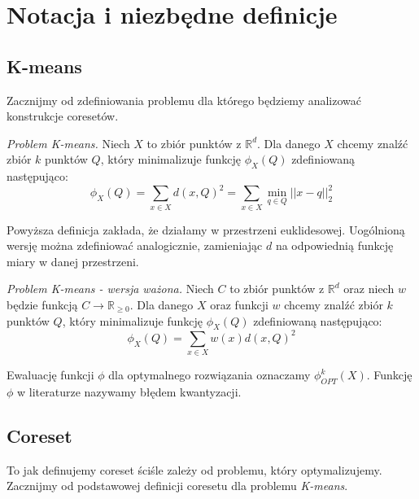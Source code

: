 \chapter{Notacja i niezbędne definicje}\label{preliminaries}
\section{K-means}

Zacznijmy od zdefiniowania problemu dla którego będziemy analizować konstrukcje coresetów.

\begin{definition}
    \emph{Problem K-means.} Niech $X$ to zbiór punktów z $\mathbb{R}^{d}$. 
    Dla danego $X$ chcemy znalźć zbiór $k$ punktów $Q$, który minimalizuje funkcję $\phi_{X}(Q)$ zdefiniowaną następująco:
    \begin{equation}
        \phi_{X}(Q) = \sum_{x \in X} d(x, Q)^{2} = \sum_{x \in X} \min_{q \in Q} || x - q ||_{2}^{2} 
    \end{equation}
\end{definition}

\noindent
Powyższa definicja zakłada, że działamy w przestrzeni euklidesowej.
Uogólnioną wersję można zdefiniować analogicznie, zamieniając $d$ na odpowiednią funkcję miary w danej przestrzeni.

\begin{definition}
    \emph{Problem K-means - wersja ważona.} Niech $C$ to zbiór punktów z $\mathbb{R}^{d}$ oraz niech $w$ będzie funkcją $C \rightarrow \mathbb{R}_{\ge0}$. 
    Dla danego $X$ oraz funkcji $w$ chcemy znalźć zbiór $k$ punktów $Q$, który minimalizuje funkcję $\phi_{X}(Q)$ zdefiniowaną następująco:
    \begin{equation}
        \phi_{X}(Q) = \sum_{x \in X} w(x) d(x, Q)^{2}
    \end{equation}
\end{definition}

\noindent
Ewaluację funkcji $\phi$ dla optymalnego rozwiązania oznaczamy $\phi_{OPT}^{k}(X)$. 
Funkcję $\phi$ w literaturze nazywamy błędem kwantyzacji.

\section{Coreset}

To jak definujemy coreset ściśle zależy od problemu, który optymalizujemy.
Zacznijmy od podstawowej definicji coresetu dla problemu \textit{K-means}.

